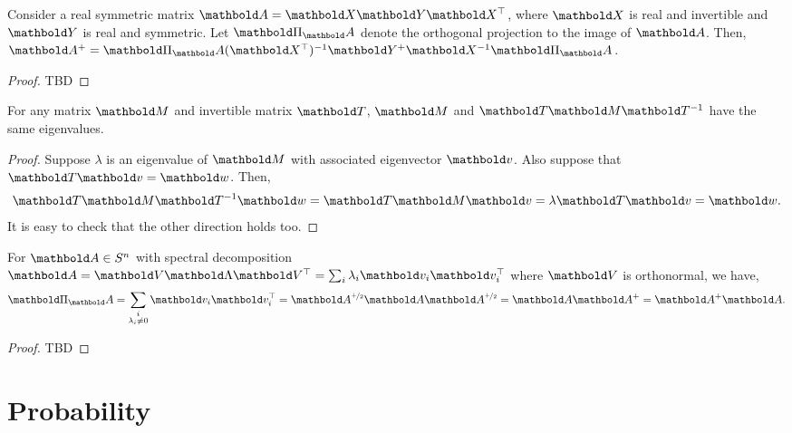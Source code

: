 \begin{lem}\label{lem:a6}
Consider a real symmetric matrix $\mA = \mX\mY\trans{\mX}$, where $\mX$ is real and invertible and $\mY$ is real and symmetric. Let $\mPi_\mA$ denote the orthogonal projection to the image of $\mA$. Then, $\pinv{\mA} = \mPi_\mA\inv{(\trans{\mX})}\pinv{\mY}\inv{\mX}\mPi_\mA$.
\end{lem}
\begin{proof} TBD
\end{proof}

\begin{lem}\label{lem:a7} For any matrix $\mM$ and invertible matrix $\mT$, $\mM$ and $\mT\mM\inv{\mT}$ have the same eigenvalues.
\end{lem}
\begin{proof}
Suppose $\lambda$ is an eigenvalue of $\mM$ with associated eigenvector $\vv$. Also suppose that $\mT\vv = \vw$. Then, \begin{align*}
    \mT\mM\inv{\mT}\vw = \mT\mM\vv = \lambda\mT\vv = \vw.
\end{align*} It is easy to check that the other direction holds too.
\end{proof}

\begin{lem}\label{lem:a8}
For $\mA \in \sS^n$ with spectral decomposition $\mA = \mV\mLambda\trans{\mV} = \sum_i \lambda_i \vv_i \trans{\vv_i}$ where $\mV$ is orthonormal, we have, \begin{align}
    \mPi_\mA = \sum_{\substack{i \\ \lambda_i \neq 0}} \vv_i \trans{\vv_i} = \mA^{\nicefrac{+}{2}}\mA\mA^{\nicefrac{+}{2}} = \mA\pinv{\mA} = \pinv{\mA}\mA.
\end{align}
\end{lem}
\begin{proof}
TBD
\end{proof}

\section{Probability}

